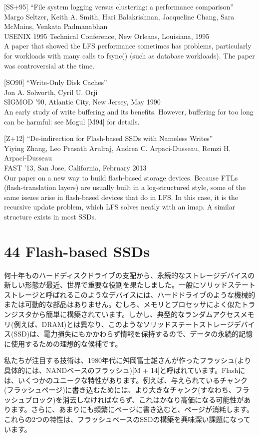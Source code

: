 {[}SS+95{]} ``File system logging versus clustering: a performance
comparison''\\
Margo Seltzer, Keith A. Smith, Hari Balakrishnan, Jacqueline Chang, Sara
McMains, Venkata Padmanabhan\\
USENIX 1995 Technical Conference, New Orleans, Louisiana, 1995\\
A paper that showed the LFS performance sometimes has problems,
particularly for workloads with many calls to fsync() (such as database
workloads). The paper was controversial at the time.

{[}SO90{]} ``Write-Only Disk Caches''\\
Jon A. Solworth, Cyril U. Orji\\
SIGMOD '90, Atlantic City, New Jersey, May 1990\\
An early study of write buffering and its benefits. However, buffering
for too long can be harmful: see Mogul {[}M94{]} for details.

{[}Z+12{]} ``De-indirection for Flash-based SSDs with Nameless
Writes''\\
Yiying Zhang, Leo Prasath Arulraj, Andrea C. Arpaci-Dusseau, Remzi H.
Arpaci-Dusseau\\
FAST '13, San Jose, California, February 2013\\
Our paper on a new way to build flash-based storage devices. Because
FTLs (flash-translation layers) are usually built in a log-structured
style, some of the same issues arise in flash-based devices that do in
LFS. In this case, it is the recursive update problem, which LFS solves
neatly with an imap. A similar structure exists in most SSDs.

\hypertarget{flash-based-ssds}{%
\section*{44 Flash-based SSDs}\label{flash-based-ssds}}

何十年ものハードディスクドライブの支配から、永続的なストレージデバイスの新しい形態が最近、世界で重要な役割を果たしました。一般にソリッドステートストレージと呼ばれるこのようなデバイスには、ハードドライブのような機械的または可動的な部品はありません。むしろ、メモリとプロセッサによく似たトランジスタから簡単に構築されています。しかし、典型的なランダムアクセスメモリ(例えば、DRAM)とは異なり、このようなソリッドステートストレージデバイス(SSD)は、電力損失にもかかわらず情報を保持するので、データの永続的記憶に使用するための理想的な候補です。

私たちが注目する技術は、1980年代に舛岡富士雄さんが作ったフラッシュ(より具体的には、NANDベースのフラッシュ){[}M
+
14{]}と呼ばれています。Flashには、いくつかのユニークな特性があります。例えば、与えられているチャンク(フラッシュページ)に書き込むためには、より大きなチャンク(すなわち、フラッシュブロック)を消去しなければならず、これはかなり高価になる可能性があります。さらに、あまりにも頻繁にページに書き込むと、ページが消耗します。これらの2つの特性は、フラッシュベースのSSDの構築を興味深い課題になっています。

